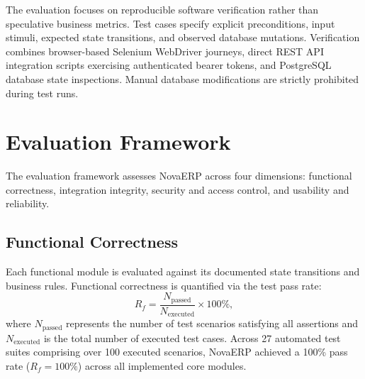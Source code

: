 \documentclass[conference]{IEEEtran}
\begin{document}
The evaluation focuses on reproducible software verification rather than speculative business metrics. Test cases specify explicit preconditions, input stimuli, expected state transitions, and observed database mutations. Verification combines browser-based Selenium WebDriver journeys, direct REST API integration scripts exercising authenticated bearer tokens, and PostgreSQL database state inspections. Manual database modifications are strictly prohibited during test runs.

\section{Evaluation Framework}
The evaluation framework assesses NovaERP across four dimensions: functional correctness, integration integrity, security and access control, and usability and reliability.

\subsection{Functional Correctness}
Each functional module is evaluated against its documented state transitions and business rules. Functional correctness is quantified via the test pass rate:
\begin{equation}
R_f = \frac{N_{\text{passed}}}{N_{\text{executed}}} \times 100\%,
\label{eq:pass_rate}
\end{equation}
where $N_{\text{passed}}$ represents the number of test scenarios satisfying all assertions and $N_{\text{executed}}$ is the total number of executed test cases. Across 27 automated test suites comprising over 100 executed scenarios, NovaERP achieved a 100\% pass rate ($R_f = 100\%$) across all implemented core modules.
\end{document}
